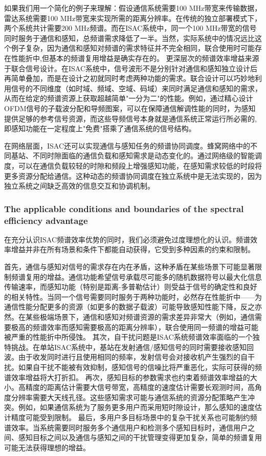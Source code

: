如果我们用一个简化的例子来理解：假设通信系统需要100 MHz带宽来传输数据，雷达系统需要100 MHz带宽来实现所需的距离分辨率。在传统的独立部署模式下，两个系统共计需要200 MHz频谱。而在ISAC系统中，同一个100 MHz带宽的信号同时服务于通信和感知，总频谱需求降低了一半。当然，实际系统中的情况远比这个例子复杂，因为通信和感知对频谱的需求特征并不完全相同，联合使用时可能存在性能折中,但基本的频谱复用增益是确实存在的。
更深层次的频谱效率增益来源于联合信号设计。在ISAC系统中，信号波形不是分别针对通信和感知独立设计后再简单叠加，而是在设计之初就同时考虑两种功能的需求。联合设计可以巧妙地利用信号的不同维度（如时域、频域、空域、码域）来同时满足通信和感知的需求，从而在给定的频谱资源上获取超越简单"一分为二"的性能。例如，通过精心设计OFDM信号的子载波分配和导频图案，可以在保障通信解调性能的同时，为感知提供足够的参考信号资源，而这些导频信号本身就是通信系统正常运行所必需的,即感知功能在一定程度上"免费"搭乘了通信系统的信号结构。

在网络层面，ISAC还可以实现通信与感知任务的频谱协同调度。蜂窝网络中的不同基站、不同时隙面临的通信负载和感知需求是动态变化的。通过网络级的智能调度，可以在通信负载较轻的时隙和频段上增强感知功能，在感知需求较低的时段将更多资源分配给通信。这种动态的频谱协同调度在独立系统中是无法实现的，因为独立系统之间缺乏高效的信息交互和协调机制。

\subsubsection{The applicable conditions and boundaries of the spectral efficiency advantage}
\label{subsubsec:ch1-isac-core value-spectrum-boundary}

在充分认识ISAC频谱效率优势的同时，我们必须避免过度理想化的认识。频谱效率增益并非在所有场景和条件下都能自动获得，它受到多种因素的约束和限制。

首先，通信与感知对信号的需求存在内在矛盾，这种矛盾在某些场景下可能显著限制频谱复用的增益。通信功能希望信号承载尽可能多的随机数据符号以最大化信息传输速率，而感知功能（特别是距离-多普勒估计）则受益于信号的确定性和良好的相关特性。当同一个信号需要同时服务于两种功能时，必然存在性能折中——为通信性能分配更多的资源（如更多的数据子载波）可能导致感知性能下降，反之亦然。在某些极端场景下，通信和感知对频谱资源的需求差异非常大（例如，通信需要极高的频谱效率而感知需要极高的距离分辨率），联合使用同一频谱的增益可能被严重的性能折中所侵蚀。
其次，自干扰问题是ISAC系统频谱效率面临的一个独特挑战。在单站ISAC系统中，基站在发射通信/感知信号的同时需要接收感知回波。由于收发同时进行且使用相同的频率，发射信号会对接收机产生强烈的自干扰。如果自干扰不能被有效抑制，感知信号的信噪比将严重恶化，实际可获得的频谱效率增益将大打折扣。
再次，感知目标的参数需求也约束着频谱效率增益的大小。高精度的距离估计需要大信号带宽，高精度的速度估计需要长观测时间，高角度分辨率需要大天线孔径。这些感知需求可能与通信系统的资源分配策略产生冲突。例如，如果通信系统为了服务更多用户而采用短时隙设计，那么感知的速度估计精度可能受到限制。
最后，多用户多目标场景中的复杂干扰关系也可能制约频谱效率。当系统需要同时服务多个通信用户和检测多个感知目标时，通信用户之间、感知目标之间以及通信与感知之间的干扰管理变得更加复杂，简单的频谱复用可能无法获得理想的增益。


